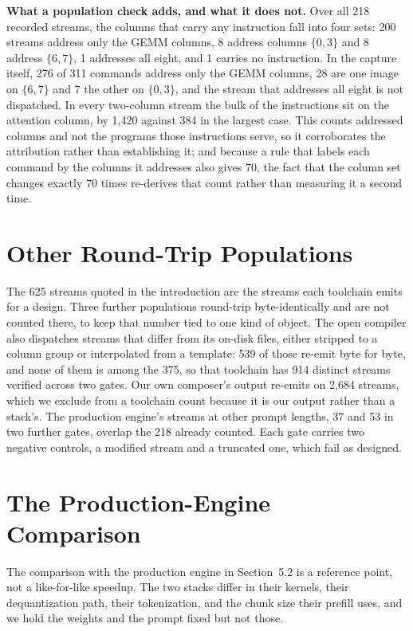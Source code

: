 \textbf{What a population check adds, and what it does not.} Over all 218 recorded streams, the columns that carry any
instruction fall into four sets: 200 streams address only the GEMM columns, 8 address columns $\{0,3\}$ and 8 address
$\{6,7\}$, 1 addresses all eight, and 1 carries no instruction. In the capture itself, 276 of 311 commands address only
the GEMM columns, 28 are one image on $\{6,7\}$ and 7 the other on $\{0,3\}$, and the stream that addresses all eight
is not dispatched. In every two-column stream the bulk of the instructions sit on the attention column, by 1{,}420
against 384 in the largest case. This counts addressed columns and not the programs those instructions serve, so it
corroborates the attribution rather than establishing it; and because a rule that labels each command by the
columns it addresses also gives 70, the fact that the column set changes exactly 70 times re-derives that count
rather than measuring it a second time.

\section{Other Round-Trip Populations}
\label{app:roundtrip}

The 625 streams quoted in the introduction are the streams each toolchain emits for a design. Three further
populations round-trip byte-identically and are not counted there, to keep that number tied to one kind of object.
The open compiler also dispatches streams that differ from its on-disk files, either stripped to a column group or
interpolated from a template: 539 of those re-emit byte for byte, and none of them is among the 375, so that toolchain
has 914 distinct streams verified across two gates. Our own composer's output re-emits on 2{,}684 streams, which we
exclude from a toolchain count because it is our output rather than a stack's. The production engine's streams at
other prompt lengths, 37 and 53 in two further gates, overlap the 218 already counted. Each gate carries two negative
controls, a modified stream and a truncated one, which fail as designed.

\section{The Production-Engine Comparison}
\label{app:flm}

The comparison with the production engine in Section~5.2 is a reference point, not a like-for-like speedup. The two
stacks differ in their kernels, their dequantization path, their tokenization, and the chunk size their prefill uses,
and we hold the weights and the prompt fixed but not those.

